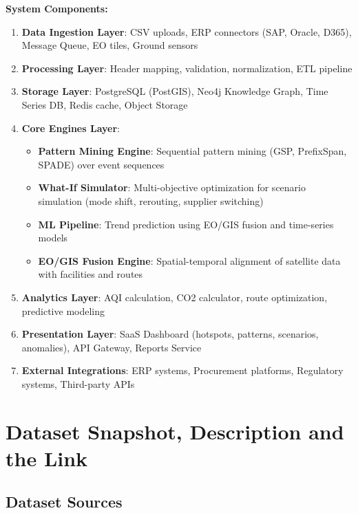 \documentclass[11pt,a4paper]{article}
\begin{document}
\textbf{System Components:}
\begin{enumerate}
    \item \textbf{Data Ingestion Layer}: CSV uploads, ERP connectors (SAP, Oracle, D365), Message Queue, EO tiles, Ground sensors
    \item \textbf{Processing Layer}: Header mapping, validation, normalization, ETL pipeline
    \item \textbf{Storage Layer}: PostgreSQL (PostGIS), Neo4j Knowledge Graph, Time Series DB, Redis cache, Object Storage
    \item \textbf{Core Engines Layer}:
    \begin{itemize}
        \item \textbf{Pattern Mining Engine}: Sequential pattern mining (GSP, PrefixSpan, SPADE) over event sequences
        \item \textbf{What-If Simulator}: Multi-objective optimization for scenario simulation (mode shift, rerouting, supplier switching)
        \item \textbf{ML Pipeline}: Trend prediction using EO/GIS fusion and time-series models
        \item \textbf{EO/GIS Fusion Engine}: Spatial-temporal alignment of satellite data with facilities and routes
    \end{itemize}
    \item \textbf{Analytics Layer}: AQI calculation, CO2 calculator, route optimization, predictive modeling
    \item \textbf{Presentation Layer}: SaaS Dashboard (hotspots, patterns, scenarios, anomalies), API Gateway, Reports Service
    \item \textbf{External Integrations}: ERP systems, Procurement platforms, Regulatory systems, Third-party APIs
\end{enumerate}

\section{Dataset Snapshot, Description and the Link}

\subsection{Dataset Sources}
\end{document}
